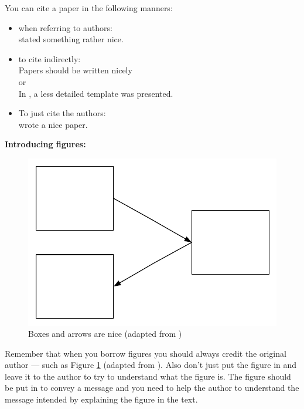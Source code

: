 You can cite a paper in the following manners: 

\begin{itemize}
\item when referring to authors:\\
 \citet{authorson10:_secon_best_paper_in_world} stated something rather nice.
\item to cite indirectly: \\
 Papers should be written nicely \citep{authorson10:_secon_best_paper_in_world}\\
or\\
In \cite{authorson10:_secon_best_paper_in_world}, a less detailed template was presented.
\item To just cite the authors: \\
\citeauthor{authorson10:_secon_best_paper_in_world} wrote a nice paper.
\end{itemize}

\vspace{0.5cm}

\noindent
{\bf Introducing figures:} \\

\begin{figure}[ht]
\begin{center}
\includegraphics[width=0.5\columnwidth]{figs/figure1.pdf}
\caption[Boxes and arrows are nice]{Boxes and arrows are nice (adapted from \citet{authorson10:_secon_best_paper_in_world})}
\label{fig:BoxesAndArrowsAreNice}
\end{center}
\end{figure}

Remember that when you borrow figures you should always credit the original author --- such as Figure \ref{fig:BoxesAndArrowsAreNice} (adapted from \citet{authorson10:_secon_best_paper_in_world}). Also don't just put the figure in and leave it to the author to try to understand what the figure is. The figure should be put in to convey a message and you need to help the author to understand the message intended by explaining the figure in the text. 

